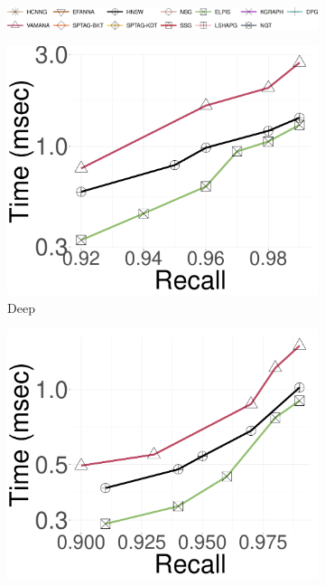  \begin{figure}[!htb]
		\captionsetup{justification=centering}
		\captionsetup[subfigure]{justification=centering}
  	\centering
		\begin{subfigure}{\textwidth}
			\includegraphics[width=\textwidth]{../img/Experiments/legendall.png}
		\end{subfigure}	
		\begin{subfigure}{\soneM\textwidth}
  \centering
			\includegraphics[width=\textwidth]{../img/Experiments/search/100/deep_10nn.pdf}
			\caption{Deep}  
		\label{fig:elpis:query:performance:100GB:deep:10NN}
		\end{subfigure}
    \hspace{0.4cm}
		\begin{subfigure}{\soneM\textwidth}
  \centering
			\includegraphics[width=\textwidth]{../img/Experiments/search/100/sift_10nn.pdf}

\end{subfigure}
\end{figure}
